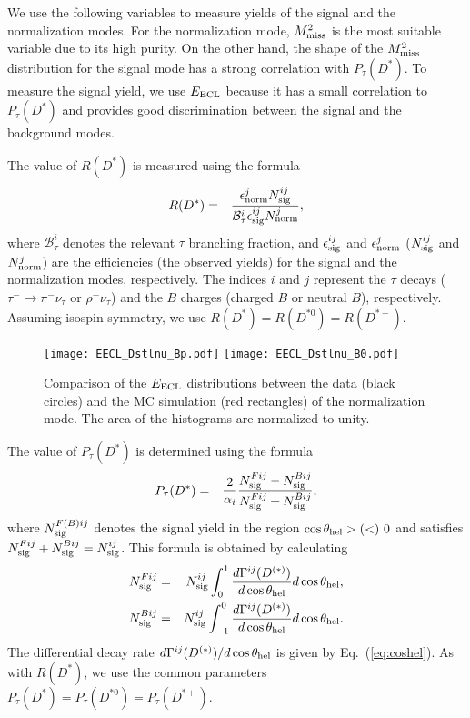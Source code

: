 \documentclass[aps,prd,twocolumn,superscriptaddress,showpacs,preprintnumbers,amsmath,amssymb]{revtex4-1}
\begin{document}
We use the following variables to measure yields of the signal and the normalization modes. For the normalization mode, $M_{\rm miss}^2$ is the most suitable variable due to its high purity. On the other hand, the shape of the $M_{\rm miss}^2$ distribution for the signal mode has a strong correlation with $P_\tau(D^*)$. To measure the signal yield, we use $E_{\rm ECL}$ because it has a small correlation to $P_\tau(D^*)$ and provides good discrimination between the signal and the background modes.

The value of $R(D^*)$ is measured using the formula
\begin{eqnarray}
  R(D^*) &=& \frac{\epsilon_{\rm norm}^j N_{\rm sig}^{ij}} {\mathcal{B}_\tau^i \epsilon_{\rm sig}^{ij} N_{\rm norm}^j},\label{eq:Rst}
\end{eqnarray}
where $\mathcal{B}_\tau^i$ denotes the relevant $\tau$ branching fraction, and $\epsilon_{\rm sig}^{ij}$ and $\epsilon_{\rm norm}^j$ ($N_{\rm sig}^{ij}$ and $N_{\rm norm}^j$) are the efficiencies (the observed yields) for the signal and the normalization modes, respectively. The indices $i$ and $j$ represent the $\tau$ decays ($\tau^- \rightarrow \pi^- \nu_\tau$ or $\rho^- \nu_\tau$) and the $B$ charges (charged $B$ or neutral $B$), respectively. Assuming isospin symmetry, we use $R(D^*) = R(D^{*0}) = R(D^{*+})$.

\begin{figure*}[t!]
  \centering
  \texttt{[image: EECL\_Dstlnu\_Bp.pdf]}
  \texttt{[image: EECL\_Dstlnu\_B0.pdf]}
  \caption{Comparison of the $E_{\rm ECL}$ distributions between the data (black circles) and the MC simulation (red rectangles) of the normalization mode. The area of the histograms are normalized to unity.}
  \label{fig:EECL_Dstlnu_comp}
\end{figure*}

The value of $P_\tau(D^*)$ is determined using the formula
\begin{eqnarray}
  P_\tau(D^*) &=& \frac{2}{\alpha_i} \frac{N_{\rm sig}^{Fij} - N_{\rm sig}^{Bij}} {N_{\rm sig}^{Fij} + N_{\rm sig}^{Bij}},\label{eq:Pst}
\end{eqnarray}
where $N_{\rm sig}^{F(B)ij}$ denotes the signal yield in the region $\cos\theta_{\rm hel} > (<)~0$ and satisfies $N_{\rm sig}^{Fij} + N_{\rm sig}^{Bij} = N_{\rm sig}^{ij}$. This formula is obtained by calculating
\begin{eqnarray}
  N_{\rm sig}^{Fij} &=& N_{\rm sig}^{ij} \int_{0}^{1} \frac{d \Gamma^{ij}(D^{(*)})}{d \cos\theta_{\rm hel}} d \cos\theta_{\rm hel},\\
  N_{\rm sig}^{Bij} &=& N_{\rm sig}^{ij} \int_{-1}^{0} \frac{d \Gamma^{ij}(D^{(*)})}{d \cos\theta_{\rm hel}} d \cos\theta_{\rm hel}.
\end{eqnarray}
The differential decay rate $d \Gamma^{ij}(D^{(*)}) / d \cos\theta_{\rm hel}$ is given by Eq.~(\ref{eq:coshel}). As with $R(D^*)$, we use the common parameters $P_\tau(D^*) = P_\tau(D^{*0}) = P_\tau(D^{*+})$.
\end{document}
